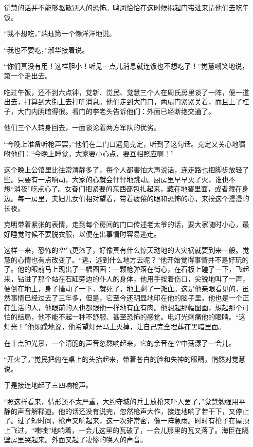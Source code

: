 \par 觉慧的话并不能够驱散别人的恐怖。鸣凤恰恰在这时候揭起门帘进来请他们去吃午饭。
\par “我不想吃，”瑞珏第一个懒洋洋地说。
\par “我也不要吃，”淑华接着说。
\par “你们真没有用！这样胆小！听见一点儿消息就连饭也不想吃了！”觉慧嘲笑地说，第一个走出去。
\par 吃过午饭，还不到六点钟，觉新、觉民、觉慧三个人在周氏房里谈了一阵，便一道出去，打算到大街上去打听消息。他们走到大门口，两扇门紧紧关着，而且上了杠子，大门内阴暗得很。看门的李老头告诉他们：外面已经断绝交通了。
\par 他们三个人转身回去，一面谈论着两方军队的优劣。
\par “今晚上准备听枪声罢，”他们在二门口遇见克定，听到了这句话。克定又关心地嘱咐他们：“今晚上睡觉，大家要小心点，要互相照应啊！”
\par 这个晚上公馆里比往常清静多了，每个人都害怕大声说话，连走路也把脚步放轻了些。只要有一点响动，大家的心就会怦怦地跳动。厨房里早早灭了火，谁也不想“消夜”吃点心了。女眷们把紧要的东西都包扎起来，藏在地窖里面，或者藏在身边。每一房里，夫妇儿女们相对望着，带着疲倦的眼和恐怖的心，来挨这个漫漫的长夜。
\par 克明带着紧张的表情，走到每个房间的门口传述老太爷的话，要大家随时小心，最好睡觉时候不要脱衣服，以便在出事情时容易逃走。
\par 这样一来，恐怖的空气更浓了，好像真有什么惊天动地的大灾祸就要到来一般。觉慧的心情也有点改变了。“逃，逃到什么地方去呢？”他开始觉得事情并不是好玩的了。他的眼前马上现出了一幅图画：一颗枪弹落在街心，在石板上碰了一下，飞起来，钻进了那个站在石缸旁边的仆人的身体，他用手按着伤口，尖锐地叫了一声，便倒在地上，身子搐动了一下，就死了，地上剩了一滩血。这是他亲眼看见的，虽然事情已经过去了三年多，但是，它至今还明显地印在他的脑子里。他也是一个正在生活的人，他眼前的人也都跟他一样地有血有肉。他想起那幅图画，想起那个可怕的结局，他不能不起一种不舒服、甚至恐怖的感觉。电灯光刺痛他的眼睛。“这灯光！”他烦躁地说，他希望灯光马上灭掉，让自己完全埋葬在黑暗里面。
\par 在十点钟光景，一个清脆的声音忽然响起来，它的余音在空中荡漾了一会儿。
\par “开火了，”觉民把俯在桌上的头抬起来，带着苍白的脸和失神的眼睛，悄然对觉慧说。
\par 于是接连地起了三四响枪声。
\par “照这样看来，情形还不太严重，大约守城的兵士放枪来吓人罢了，”觉慧勉强用平静的声音解释道。他的话还没有说完，忽然枪声大作，接连地响了若干下，又停止了。过了短时间，枪声又响起来，这一次非常密，像一阵急雨。时时有枪子在屋顶上飞过，“嗤嗤”地响着，一会儿这里的瓦破了，一会儿那里的瓦又落了。海臣在隔壁房里哭起来。外面又起了凄惨的唤人的声音。
